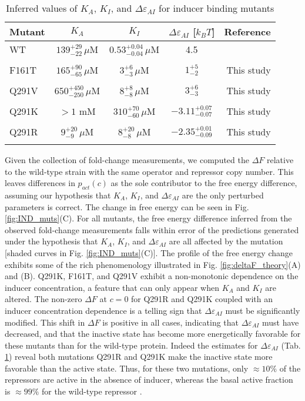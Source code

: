 \begin{table}[t]
\centering
    \caption{Inferred values of $K_A$, $K_I$, and $\Delta\varepsilon_{AI}$ for 
             inducer binding mutants}
    \begin{tabular}{lcccr}
    Mutant & $K_A$  & $K_I$  & $\Delta\varepsilon_{AI}$ [$k_BT$] & Reference \\
    \midrule
    WT & $139^{+29}_{-22}\,\mu$M & $0.53^{+0.04}_{-0.04}\,\mu$M & 4.5 & \cite{Razo-Mejia2018}\\
    &&&&\\
    F161T & $165^{+90}_{-65}\,\mu$M & $3^{+6}_{-3}\,\mu$M & $1^{+5}_{-2}$
    & This study\\
    &&&&\\
    Q291V & $650^{+450}_{-250}\,\mu$M & $8^{+8}_{-8}\,\mu$M &
    $3^{+6}_{-3}$ & This study\\
    &&&&\\
    Q291K & $> 1$ mM & $310^{+70}_{-60}\,\mu$M & $-3.11^{+0.07}_{-0.07}$ &
    This study\\
    &&&&\\
    Q291R & $9_{-9}^{+20}\,\mu$M & $8^{+20}_{-8}\,\mu$M & $-2.35^{+0.01}_{-0.09}$ & This study\\
    \bottomrule
    \label{tab:ind_params}
    \end{tabular}
\end{table} 

Given the collection of fold-change measurements, we computed the $\Delta F$
relative to the wild-type strain with the same operator and repressor copy
number. This leaves differences in $p_{act}(c)$ as the sole contributor to
the free energy difference, assuming our hypothesis that $K_A$, $K_I$, and
$\Delta\varepsilon_{AI}$ are the only perturbed parameters is correct. The
change in free energy can be seen in Fig. \ref{fig:IND_muts}(C). For all
mutants, the free energy difference inferred from the observed fold-change
measurements falls within error of the predictions generated under the
hypothesis that $K_A$, $K_I$, and $\Delta\varepsilon_{AI}$ are all affected
by the mutation [shaded curves in Fig. \ref{fig:IND_muts}(C)]. The profile of
the free energy change exhibits some of the rich phenomenology illustrated in
Fig. \ref{fig:deltaF_theory}(A) and (B). Q291K, F161T, and Q291V exhibit a
non-monotonic dependence on the inducer concentration, a feature that can
only appear when $K_A$ and $K_I$ are altered. The non-zero $\Delta F$ at
$c=0$ for Q291R and Q291K coupled with an inducer concentration dependence is
a telling sign that $\Delta\varepsilon_{AI}$ must be significantly modified.
This shift in $\Delta F$ is positive in all cases, indicating that
$\Delta\varepsilon_{AI}$ must have decreased, and that the inactive state
has become more energetically favorable for these mutants than for the wild-type protein. Indeed
the estimates for $\Delta\varepsilon_{AI}$ (Tab. \ref{tab:ind_params})
reveal both mutations Q291R and Q291K make
the inactive state more favorable than the active state. Thus, for these two
mutations, only $\approx 10\%$ of the repressors are active in the absence of
inducer, whereas the basal active fraction is $\approx 99\%$ for the wild-type
repressor \cite{Razo-Mejia2018}. 

